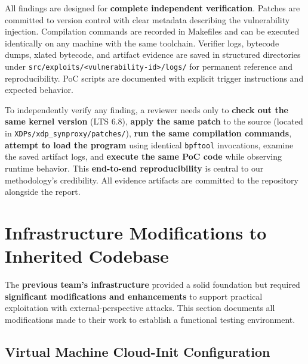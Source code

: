 \noindent
All findings are designed for \textbf{complete independent verification}. Patches are committed to version control with clear metadata describing the vulnerability injection. Compilation commands are recorded in Makefiles and can be executed identically on any machine with the same toolchain. Verifier logs, bytecode dumps, xlated bytecode, and artifact evidence are saved in structured directories under \texttt{src/exploits/<vulnerability-id>/logs/} for permanent reference and reproducibility. PoC scripts are documented with explicit trigger instructions and expected behavior.

To independently verify any finding, a reviewer needs only to \textbf{check out the same kernel version} (LTS 6.8), \textbf{apply the same patch} to the source (located in \texttt{XDPs/xdp\_synproxy/patches/}), \textbf{run the same compilation commands}, \textbf{attempt to load the program} using identical \texttt{bpftool} invocations, examine the saved artifact logs, and \textbf{execute the same PoC code} while observing runtime behavior. This \textbf{end-to-end reproducibility} is central to our methodology's credibility. All evidence artifacts are committed to the repository alongside the report.

\section{Infrastructure Modifications to Inherited Codebase}
\label{sec:infra-modifications}

The \textbf{previous team's infrastructure} provided a solid foundation but required \textbf{significant modifications and enhancements} to support practical exploitation with external-perspective attacks. This section documents all modifications made to their work to establish a functional testing environment.

\subsection{Virtual Machine Cloud-Init Configuration}


